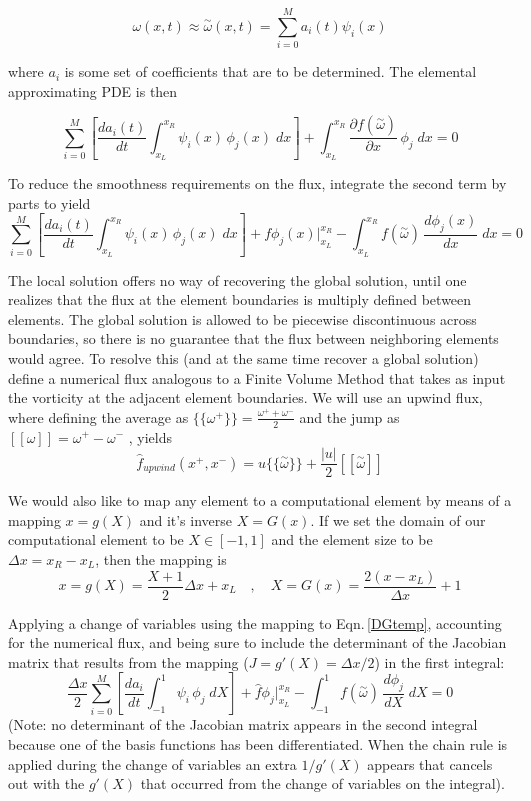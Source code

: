 \documentclass[letterpaper,12pt]{report}
\newcommand{\be}{\begin{equation}}
\newcommand{\ben}[1]{\begin{equation}\label{#1}}
\newcommand{\ee}{\end{equation}}
\newcommand{\aomega}{\overset{\sim}{\omega}}				%
\begin{document}
\be \omega(x,t) \approx \aomega(x,t) = \sum_{i=0}^M a_i(t)\psi_i(x)\ee

where $a_i$ is some set of coefficients that are to be determined. The elemental approximating PDE is then

\be \sum_{i=0}^M \left[ \frac{d a_i(t)}{dt}\int_{x_L}^{x_R}\psi_i(x)  \, \phi_j(x) \;dx \right]
+ \int_{x_L}^{x_R} \frac{\partial f(\aomega)}{\partial x} \, \phi_j \;dx = 0 \ee

To reduce the smoothness requirements on the flux, integrate the second term by parts to yield
\ben{DGtemp} \sum_{i=0}^M \left[ \frac{d a_i(t)}{dt}\int_{x_L}^{x_R}\psi_i(x)  \, \phi_j(x) \;dx \right]
+ f\phi_j(x) \Big|^{x_R}_{x_L} 
- \int_{x_L}^{x_R} f(\aomega) \, \frac{d \phi_j(x)}{d x} \;dx = 0 \ee

The local solution offers no way of recovering the global solution, until one realizes that the flux at the element boundaries is multiply defined between elements. The global solution is allowed to be piecewise discontinuous across boundaries, so there is no guarantee that the flux between neighboring elements would agree. To resolve this (and at the same time recover a global solution) define a numerical flux analogous to a Finite Volume Method that takes as input the vorticity at the adjacent element boundaries. We will use an upwind flux, where defining the average as $\{\!\{\omega^+\}\!\} = \frac{\omega^++\omega^-}{2}$ and the jump as $[[\omega]]=\omega^+-\omega^-$ \cite{HestWar}, yields
\be \hat{f}_{upwind}(x^+,x^-)=u\{\!\{\aomega\}\!\} + \frac{|u|}{2}[[\aomega]]\ee

We would also like to map any element to a computational element by means of a mapping $x=g(X)$ and it's inverse $X=G(x)$. If we set the domain of our computational element to be $X \in [-1, 1]$ and the element size to be $\Delta x = x_R - x_L$, then the mapping is
\be x=g(X)=\frac{X+1}{2}\Delta x + x_L\quad ,\quad X=G(x)=\frac{2(x-x_L)}{\Delta x}+1 \ee

Applying a change of variables using the mapping to Eqn.\,\eqref{DGtemp}, accounting for the numerical flux, and being sure to include the determinant of the Jacobian matrix that results from the mapping ($J=g'(X)=\Delta x/2$) in the first integral:
\ben{DGtemp2} \frac{\Delta x}{2}	\sum_{i=0}^M \left[ \frac{d a_i}{dt}	\int_{-1}^{1}\psi_i  \, \phi_j \;dX \right]
+\hat{f}\phi_j \Big|^{x_R}_{x_L} 
- \int_{-1}^{1} f(\aomega) \, \frac{d \phi_j}{dX} \;dX = 0 \ee
(Note: no determinant of the Jacobian matrix appears in the second integral because one of the basis functions has been differentiated. When the chain rule is applied during the change of variables an extra $1/g'(X)$ appears that cancels out with the $g'(X)$ that occurred from the change of variables on the integral).
\end{document}
